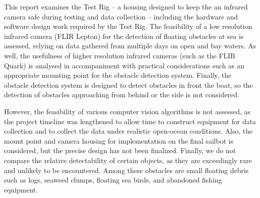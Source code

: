 
\iffalse
From the guideline:
This is where the subject of the report can be specified fully; indicate not only what you are examining, but also when and where, as appropriate. As well as knowing what to expect in your report, your reader needs to know what not to expect. Indicate the kinds of problems, places, times, and personnel that are not considered and the impact these omissions and constraints may have on your results. You may also want to explain why these limitations have been necessary.

Notes:
what does the report consider?
-test rig, design and development
-testing IR camera feasibility on two days
-developing a control system for the test rig, allowing for video capture
-the team might be able to get a better camera
-long cables seem to be fine

what didn't we do?
-we don't evaluate which algorithms are best
--we spent a lot of time getting ready to gather data (getting test rigs built and working)
--lots of time on video processing systems to get good contrast
-the lepton cannot see small objects such as logs
-we don't provide a final housing
--sailbot might use our lepton holder, but will need to design a smaller waterproof case for it

impact of omissions:
-we can suggest a lepton holder, but not a final housing
-our work will help the sailbot team test algorithms and gather data, but we can't comment on the best algorithms
\fi

This report examines the Test Rig -- a housing designed to keep the an infrared camera safe during testing and data collection -- including the hardware and software design work required by the Test Rig. The feasibility of a low resolution infrared camera (FLIR Lepton) for the detection of floating obstacles at sea is assessed, relying on data gathered from multiple days on open and bay waters. As well, the usefulness of higher resolution infrared cameras (such as the FLIR Quark) is analysed in accompaniment with practical considerations such as an appropriate mounting point for the obstacle detection system. Finally, the obstacle detection system is designed to detect obstacles in front the boat, so the detection of obstacles approaching from behind or the side is not considered.

However, the feasibility of various computer vision algorithms is not assessed, as the project timeline was lengthened to allow time to construct equipment for data collection and to collect the data under realistic open-ocean conditions. Also, the mount point and camera housing for implementation on the final sailbot is considered, but the precise design has not been finalized. Finally, we do not compare the relative detectability of certain objects, as they are exceedingly rare and unlikely to be encountered. Among these obstacles are small floating debris such as logs, seaweed clumps, floating sea birds, and abandoned fishing equipment.
